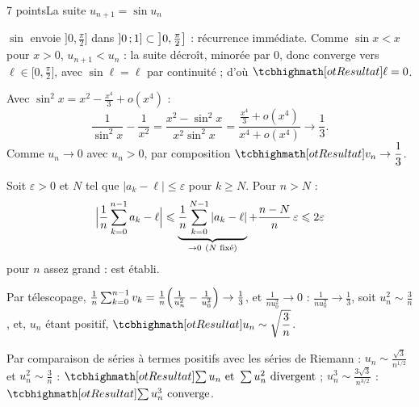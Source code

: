 \begin{corrigeEval}[Problème]{7 points}{La suite $u_{n+1}=\sin u_n$}
\begin{questions}
  \item $\sin$ envoie $\bigl]0,\frac\pi2\bigr]$ dans $\mathopen{]}0\,{;}\,1\mathclose{]}\subset\bigl]0,\frac\pi2\bigr]$ :
    récurrence immédiate. Comme $\sin x<x$ pour $x>0$, $u_{n+1}<u_n$ : la
    suite décroît, minorée par $0$, donc converge vers
    $\ell\in\bigl[0,\frac\pi2\bigr]$, avec $\sin\ell=\ell$ par continuité ;
    d'où $\res{\ell=0}$. \pts{1 pt}
  \item Avec $\sin^{2}x=x^{2}-\frac{x^{4}}3+o(x^{4})$ :
    \[\frac{1}{\sin^{2}x}-\frac{1}{x^{2}}=\frac{x^{2}-\sin^{2}x}{x^{2}\sin^{2}x}
      =\frac{\frac{x^{4}}{3}+o(x^{4})}{x^{4}+o(x^{4})}\longrightarrow\frac13.\]
    Comme $u_n\to0$ avec $u_n>0$, par composition $\res{v_n\to\dfrac13}$.
  \item Soit $\varepsilon>0$ et $N$ tel que $|a_k-\ell|\leqslant\varepsilon$ pour
    $k\geqslant N$. Pour $n>N$ :
    \[\Bigl|\frac1n\sum_{k=0}^{n-1}a_k-\ell\Bigr|\leqslant
      \underbrace{\frac1n\sum_{k=0}^{N-1}|a_k-\ell|}_{\to0\ (N\text{ fixé})}
      +\frac{n-N}{n}\,\varepsilon\leqslant2\varepsilon\]
    pour $n$ assez grand :  est établi.
  \item Par télescopage,
    $\frac1n\sum_{k=0}^{n-1}v_k=\frac1n\Bigl(\frac{1}{u_n^{2}}-\frac{1}{u_0^{2}}\Bigr)\to\frac13$,
    et $\frac{1}{nu_0^{2}}\to0$ : $\frac{1}{nu_n^{2}}\to\frac13$, soit
    $u_n^{2}\sim\frac3n$, et, $u_n$ étant positif,
    $\res{u_n\sim\sqrt{\dfrac3n}}$. 
  \item Par comparaison de séries à termes positifs avec les séries de
    Riemann : $u_n\sim\frac{\sqrt3}{n^{1/2}}$ et $u_n^{2}\sim\frac3n$ :
    $\res{\sum u_n\text{ et }\sum u_n^{2}\text{ divergent}}$ ;
    $u_n^{3}\sim\frac{3\sqrt3}{n^{3/2}}$ : $\res{\sum u_n^{3}\text{ converge}}$.
\end{questions}
\begin{center}\begin{minipage}{\linewidth}\centering
{}
\end{minipage}
\end{center}
\end{corrigeEval}
